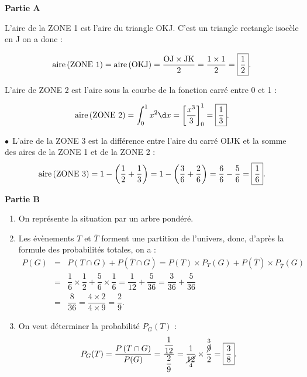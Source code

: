 \smallskip

\textbf{Partie A}

\medskip

L'aire de la ZONE 1 est l'aire du triangle OKJ. C'est un triangle rectangle isocèle en J on a donc :

\[\text{aire\,(ZONE 1)} = \text{aire\,(OKJ)} = \dfrac{\mathrm{OJ} \times \mathrm{JK}}{2} = \dfrac{1\times 1}{2} = \boxed{\dfrac{1}{2}}.\]

\smallskip

L'aire de ZONE 2 est l'aire sous la courbe de la fonction carré entre 0 et 1 :

\[\text{aire\,(ZONE 2)} = \int_{0}^{1}x^{2}\d x = \left[\dfrac{x^{3}}{3}\right]_{0}^{1} = \boxed{\dfrac{1}{3}}.\]
\smallskip

$\bullet~~$L'aire de la ZONE 3 est la différence entre l'aire du carré OIJK et la somme des aires de la ZONE 1 et de la ZONE 2 :
\[\text{aire\,(ZONE 3)} = 1  - \left(\dfrac{1}{2} + \dfrac{1}{3}\right) = 1 - \left(\dfrac{3}{6} + \dfrac{2}{6}\right) = \dfrac{6}{6} - \dfrac{5}{6} = \boxed{\dfrac{1}{6}}.\]





\medskip

\textbf{Partie B}

\medskip

\begin{enumerate}
	\item On représente la situation par un arbre pondéré.
	
	\begin{center}
	\end{center}
	\item Les évènements $T$ et $\overline{T}$ forment une partition de l'univers, donc, d'après la formule des probabilités totales, on a :
	\begin{eqnarray*}
		P(G) &=& P\left(T \cap G\right) + P\left(\overline{T} \cap G\right) = P(T) \times P_{T}(G) + P\left(\overline{T}\right) \times P_{\overline{T}}(G)\\
		&=& \dfrac{1}{6} \times \dfrac{1}{2} + \dfrac{5}{6} \times \dfrac{1}{6} = \dfrac{1}{12} + \dfrac{5}{36} = \dfrac{3}{36} + \dfrac{5}{36}\\
		&=& \dfrac{8}{36} = \dfrac{4 \times 2}{4 \times 9} =  \boxed{\dfrac{2}{9}}.
	\end{eqnarray*}
	\item On veut déterminer la probabilité $P_{G}(T)$ :
	\[P_{G}(T) = \dfrac{P\left(T \cap G\right)}{P(G)} = \dfrac{\dfrac{1}{12}}{\dfrac{2}{9}} = \dfrac{1}{\underset{4}{\cancel{12}}} \times \dfrac{\overset{3}{\cancel{9}}}{2} = \boxed{\dfrac{3}{8}}.\]
\end{enumerate}

